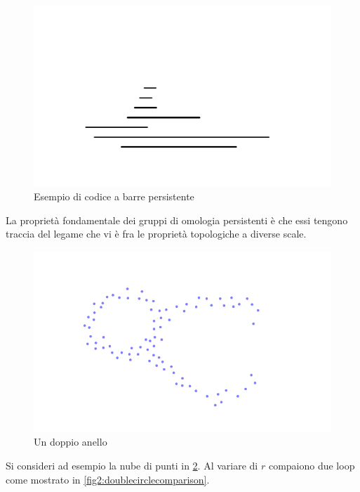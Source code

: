 \begin{figure}[h]
  \begin{center}
    \includegraphics[width=.7\paperwidth]{gfx/barcodes_multiple.pdf}
    \caption{Esempio di codice a barre persistente}
    \label{fig:typicalbarcode}
  \end{center}
\end{figure}

La proprietà fondamentale dei gruppi di omologia persistenti è che essi tengono traccia del legame che vi è fra le proprietà topologiche a diverse scale.

\begin{figure}[ht]
  \begin{center}
    \includegraphics{gfx/double_circle_small.pdf}
    \caption{Un doppio anello}
    \label{fig2:doublecircle}
  \end{center}
\end{figure}

Si consideri ad esempio la nube di punti in \cref{fig2:doublecircle}. Al variare di $r$ compaiono due loop come mostrato in \cref{fig2:doublecirclecomparison}.

